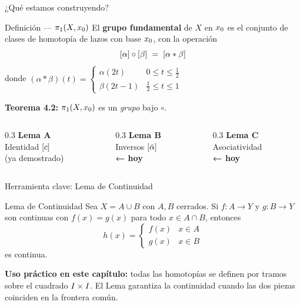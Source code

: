 \begin{frame}{¿Qué estamos construyendo?}
  \begin{block}{Definición — $\pi_1(X,x_0)$}
    El \textbf{grupo fundamental} de $X$ en $x_0$ es el conjunto de clases de
    homotopía de lazos con base $x_0$, con la operación
    \[
      [\alpha] \circ [\beta] \;=\; [\alpha * \beta]
    \]
    donde $(\alpha * \beta)(t) =
      \begin{cases} \alpha(2t) & 0 \le t \le \tfrac{1}{2}\\
                    \beta(2t-1) & \tfrac{1}{2} \le t \le 1 \end{cases}$
  \end{block}

  \bigskip
  \textbf{Teorema 4.2:} $\pi_1(X,x_0)$ es un \emph{grupo} bajo $\circ$.
  \medskip

  \begin{columns}[T]
    \begin{column}{0.3\textwidth}
      \centering
      \textcolor{verdeTeal}{\textbf{Lema A}}\\\smallskip
      Identidad $[c]$\\\smallskip
      {\footnotesize (ya demostrado)}
    \end{column}
    \begin{column}{0.3\textwidth}
      \centering
      \textcolor{morado}{\textbf{Lema B}}\\\smallskip
      Inversos $[\bar{\alpha}]$\\\smallskip
      {\footnotesize \textbf{← hoy}}
    \end{column}
    \begin{column}{0.3\textwidth}
      \centering
      \textcolor{coralOscuro}{\textbf{Lema C}}\\\smallskip
      Asociatividad\\\smallskip
      {\footnotesize \textbf{← hoy}}
    \end{column}
  \end{columns}
\end{frame}

\begin{frame}{Herramienta clave: Lema de Continuidad}
  \begin{alertblock}{Lema de Continuidad}
    Sea $X = A \cup B$ con $A, B$ cerrados. Si $f:A \to Y$ y $g:B \to Y$ son
    continuas con $f(x)=g(x)$ para todo $x \in A \cap B$, entonces
    \[
      h(x) = \begin{cases} f(x) & x \in A \\ g(x) & x \in B \end{cases}
    \]
    es continua.
  \end{alertblock}

  \bigskip
  \textbf{Uso práctico en este capítulo:} todas las homotopías se definen por
  tramos sobre el cuadrado $I \times I$.  El Lema garantiza la continuidad cuando
  las dos piezas coinciden en la frontera común.
\end{frame}
